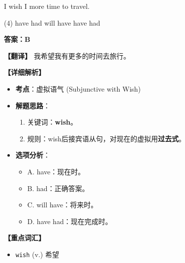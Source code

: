 \documentclass[11pt, a4paper]{article}
\newcommand{\analysis}[4]{
    \begin{solutionbox}
        \textbf{答案：#1}
        
        \textbf{【翻译】} #2
        
        \textbf{【详细解析】}
        #3
        
        \textbf{【重点词汇】}
        #4
    \end{solutionbox}
}
\newcommand{\blank}{\underline{\hspace{1.5cm}}}
\begin{document}
\begin{questions}
    \item I wish I \blank more time to travel.
    \begin{tasks}(4)
        \task have \task had \task will have \task have had
    \end{tasks}
    \analysis{B}{我希望我有更多的时间去旅行。}{
        \begin{itemize}
            \item \textbf{考点}：虚拟语气 (Subjunctive with Wish)
            \item \textbf{解题思路}：
                \begin{enumerate}
                    \item 关键词：\textbf{wish}。
                    \item 规则：wish后接宾语从句，对现在的虚拟用\textbf{过去式}。
                \end{enumerate}
            \item \textbf{选项分析}：
                \begin{itemize}
                    \item A. have：现在时。
                    \item B. had：正确答案。
                    \item C. will have：将来时。
                    \item D. have had：现在完成时。
                \end{itemize}
        \end{itemize}
    }{
        \begin{itemize}
            \item \texttt{wish} (v.) 希望
        \end{itemize}
    }


\end{questions}
\end{document}
